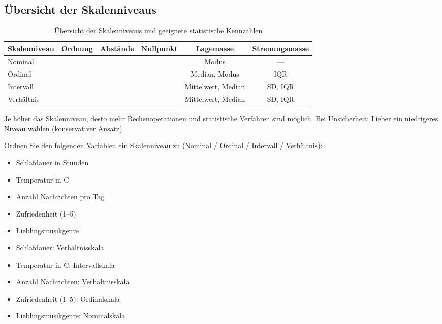 \subsection{Übersicht der Skalenniveaus}

\begin{table}[H]
	\centering
	\small
	\begin{tabular}{l c c c c c}
		\toprule
		\textbf{Skalenniveau} & \textbf{Ordnung} & \textbf{Abstände} & \textbf{Nullpunkt} & \textbf{Lagemasse} & \textbf{Streuungsmasse}       \\
		\midrule
		Nominal               & \xmark           & \xmark            & \xmark             & Modus              & ---                           \\
		Ordinal               & \cmark           & \xmark            & \xmark             & Median, Modus      & \acrshort{IQR}                \\
		Intervall             & \cmark           & \cmark            & \xmark             & Mittelwert, Median & \acrshort{SD}, \acrshort{IQR} \\
		Verhältnis            & \cmark           & \cmark            & \cmark             & Mittelwert, Median & \acrshort{SD}, \acrshort{IQR} \\
		\bottomrule
	\end{tabular}
	\caption{Übersicht der Skalenniveaus und geeignete statistische Kennzahlen}
	\label{table:skalenniveaus}
\end{table}

\begin{myremark}
	Je höher das Skalenniveau, desto mehr Rechenoperationen und statistische Verfahren sind möglich.
	Bei Unsicherheit: Lieber ein niedrigeres Niveau wählen (konservativer Ansatz).
\end{myremark}

\begin{myexercise}\label{myexercise:skalenniveaus-zuordnen}
	Ordnen Sie den folgenden Variablen ein Skalenniveau zu (Nominal / Ordinal / Intervall / Verhältnis):
	\begin{itemize}
		\item Schlafdauer in Stunden
		\item Temperatur in \textdegree C
		\item Anzahl Nachrichten pro Tag
		\item Zufriedenheit (1--5)
		\item Lieblingsmusikgenre
	\end{itemize}
	\begin{myanswer}
		\begin{itemize}
			\item Schlafdauer: Verhältnisskala
			\item Temperatur in \textdegree C: Intervallskala
			\item Anzahl Nachrichten: Verhältnisskala
			\item Zufriedenheit (1--5): Ordinalskala
			\item Lieblingsmusikgenre: Nominalskala
		\end{itemize}
	\end{myanswer}
\end{myexercise}

